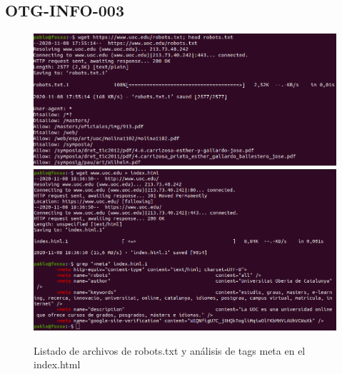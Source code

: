 \documentclass[10pt,a4paper]{article}
\begin{document}
\subsection{OTG-INFO-003}
\label{ann:otg-info-003}
\begin{figure}[h!]
  \centering
  \includegraphics[scale=0.25]{robots.png}
  \includegraphics[scale=0.25]{meta.png}
  \caption{Listado de archivos de robots.txt y análisis de tags meta en el index.html}
  \label{fig:otg-info-003}
\end{figure}

\pagebreak
\end{document}
